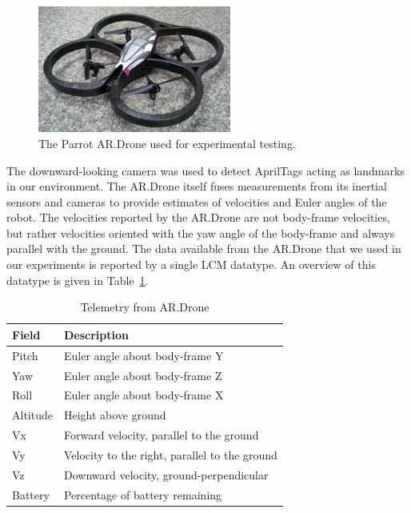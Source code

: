 \documentclass[conference]{IEEEtran}
\begin{document}
\begin{figure}[!h]
  \centering
  \includegraphics[width=2.5in]{images/drone1}
  \caption{The Parrot AR.Drone used for experimental testing.}
  \label{fig:drone}
\end{figure}

The downward-looking camera was used to detect AprilTags acting as landmarks in our environment.
The AR.Drone itself fuses measurements from its inertial sensors and cameras to provide estimates 
of velocities and Euler angles of the robot. The velocities reported by the AR.Drone are not body-frame 
velocities, but rather velocities oriented with the yaw angle of the body-frame and always parallel 
with the ground. The data available from the AR.Drone that we used in our experiments is reported by 
a single LCM datatype. An overview of this datatype is given in Table~\ref{tab:telemetry}.

\begin{table}[!t]
\renewcommand{\arraystretch}{1.3}
\caption{Telemetry from AR.Drone}
\label{tab:telemetry}
\centering
\begin{tabular}{|l|l|}
\hline
Field & Description \\
\hline
Pitch & Euler angle about body-frame Y \\
Yaw & Euler angle about body-frame Z \\
Roll & Euler angle about body-frame X \\
Altitude & Height above ground \\
Vx & Forward velocity, parallel to the ground \\
Vy & Velocity to the right, parallel to the ground \\
Vz & Downward velocity, ground-perpendicular \\
Battery & Percentage of battery remaining \\
\hline
\end{tabular}
\end{table}
\end{document}
